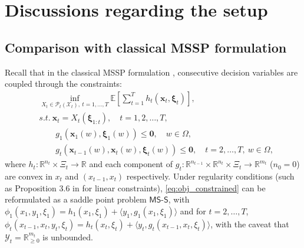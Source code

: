 \documentclass[11pt,fullpage,letterpaper]{article}
\newcommand{\mc}{\mathcal}
\newcommand{\mb}{\mathbf}
\newcommand{\R}{\mathbb{R}}
\newcommand{\E}{\mathbb{E}}
\newcommand{\bx}{\boldsymbol{\xi}}
\newcommand{\mssp}{$\mathsf{MS}$-$\mathsf{S}$}
\begin{document}
\printbibliography
\newpage




\appendix

\section{Discussions regarding the setup}

\subsection{Comparison with classical MSSP formulation}\label{sec:lagrangian}

Recall that in the classical MSSP formulation \cite{Shapiro2021Lectures}, consecutive decision variables are coupled through the constraints:
\begin{align}\label{eq:obj_constrained}
     &\inf_{X_t\in \mc P_t(\mc X_t),~t=1,\ldots,T} \E[\sum_{t=1}^T h_{t}(\mb x_t,\bx_t)],\\
     &s.t.~\mb x_t = X_t(\bx_{1:t}),\quad t=1,2,\ldots,T,\nonumber\\
     &\quad\quad  g_1(\mb x_1(w),\bx_1(w))\leq \mb 0,\quad  w\in \Omega,\nonumber\\
     &\quad \quad g_t(\mb x_{t-1}(w),\mb x_t(w),\bx_t(w))\leq \mb 0,\quad t = 2,\ldots,T,~  w\in \Omega,\nonumber
\end{align}
where $h_t:\R^{n_t}\times \Xi_t\to \R$ and each component of $g_t:\R^{n_{t-1}}\times \R^{n_t}\times \Xi_t\to \R^{m_t}$ ($n_0=0$) are convex in $x_t$ and $(x_{t-1},x_t)$ respectively. Under regularity conditions (such as Proposition 3.6 in \cite{Shapiro2021Lectures} for linear constraints), \eqref{eq:obj_constrained} can be reformulated as a saddle point problem \mssp, with $\phi_1(x_1,y_1,\xi_1) = h_1(x_1,\xi_1) + \langle y_1,g_1(x_1,\xi_1)\rangle $ and for $t = 2,\ldots,T$, $\phi_{t}(x_{t-1},x_t,y_t,\xi_t) = h_t(x_t,\xi_t) + \langle y_t,g_t(x_{t-1},x_t,\xi_t)\rangle$, with the caveat that $\mc Y_t = \R_{\geq 0}^{m_t}$ is unbounded. 
\end{document}
